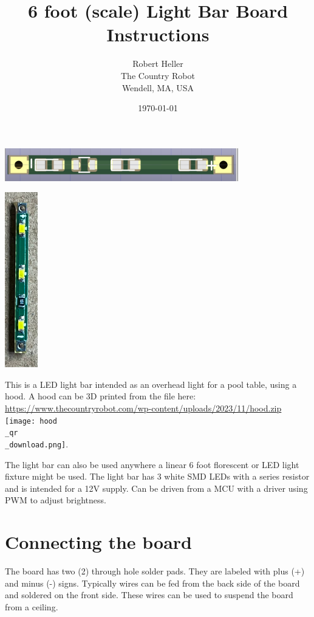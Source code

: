 \documentclass[12pt,twoside]{article}
\title{6 foot (scale) Light Bar Board Instructions}
\author{Robert Heller \\ The Country Robot \\ Wendell, MA, USA}
\date{\today}
\begin{document}
\maketitle


\begin{centering}\includegraphics[width=4in]{6footfl3d.png}\\\end{centering}

\begin{centering}\includegraphics[height=3in]{6footfl_photo.png}\\\end{centering}

This is a LED light bar intended as an overhead light for a pool table, using
a hood. A hood can be 3D printed from the file here: 
\url{https://www.thecountryrobot.com/wp-content/uploads/2023/11/hood.zip}\\
\texttt{[image: hood\\\_qr\\\_download.png]}.

The light bar can also be used anywhere a linear 6 foot florescent or LED light
fixture might be used. The light bar has 3 white SMD LEDs with a series
resistor and is intended for a 12V supply. Can be driven from a MCU with a
driver using PWM to adjust brightness. 

\section{Connecting the board}

The board has two (2) through hole solder pads. They are labeled with plus (+) 
and minus (-) signs.  Typically wires can be fed from the back side of the 
board and soldered on the front side.  These wires can be used to suspend the 
board from a ceiling.
\end{document}
